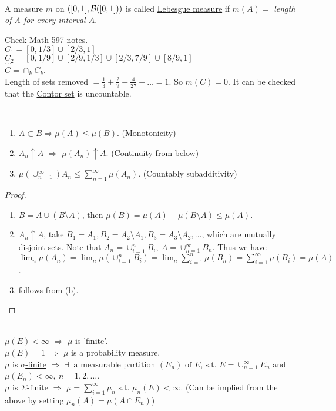 \begin{definition}\ \\
A measure $m$ on $([0,1], \mathcal{B}([0,1]))$ is called \underline{Lebesgue measure} if $m(A) = $ \textit{length of A for every interval $A$}.
\end{definition}

\vspace{3pt}
\begin{example}
Check Math 597 notes.\\
$C_1 = [0,1/3] \cup [2/3, 1]$\\
$C_2 = [0,1/9] \cup [2/9, 1/3] \cup [2/3, 7/9] \cup [8/9, 1]$\\
$\dots$\\
$C = \cap_k C_k$.\\
Length of sets removed $= \frac13 + \frac29 + \frac{4}{27} + \dots = 1$. So $m(C) = 0$. It can be checked that the \underline{Contor set} is uncountable.
\end{example}

\vspace{3pt}
\begin{lemma}\ 
\begin{enumerate}[label = (\alph*)]
    \item $A \subset B \Rightarrow \mu(A) \leq \mu(B)$. (Monotonicity)
    \item $A_n \uparrow A$ $\Rightarrow$ $\mu(A_n) \uparrow A$. (Continuity from below)
    \item $\mu(\cup_{n = 1}^\infty) A_n \leq \sum_{n=1}^\infty \mu(A_n)$. (Countably subadditivity)
\end{enumerate}
\end{lemma}
\begin{proof}\
\begin{enumerate}[label = (\alph*)]
    \item $B = A \cup (B \setminus A)$, then $\mu(B) = \mu(A) + \mu(B \setminus A) \leq \mu(A)$. 
    \item $A_n \uparrow A$, take $B_1 = A_1, B_2 = A_2 \setminus A_1, B_3 = A_3 \setminus A_2,\dots$, which are mutually disjoint sets. Note that $A_n = \cup_{i=1}^n B_i,\ A = \cup_{n=1}^\infty B_n$. Thus we have $\lim_n{\mu(A_n)} = \lim_n \mu(\cup_{i = 1}^n B_i) = \lim_n \sum_{i=1}^n \mu(B_n) = \sum_{i = 1}^\infty \mu(B_i) = \mu(A)$.
    \item follows from (b).
\end{enumerate}
\end{proof}

\begin{remark}\ \\
$\mu(E) < \infty$ $\Rightarrow$ $\mu$ is 'finite'.\\
$\mu(E) = 1$ $\Rightarrow$ $\mu$ is a probability measure.\\
$\mu$ is \underline{$\sigma$-finite} $\Rightarrow$ $\exists\ \text{ a measurable partition } (E_n) \text{ of } E$, s.t. $E = \cup_{n = 1}^\infty E_n$ and $\mu(E_n) < \infty,\ n =1,2,\dots$.\\
$\mu$ is $\Sigma$-finite $\Rightarrow$ $\mu = \sum_{i=1}^\infty \mu_n$ s.t. $\mu_n(E) < \infty$. (Can be implied from the above by setting $\mu_n(A) = \mu(A \cap E_n)$)
\end{remark}

